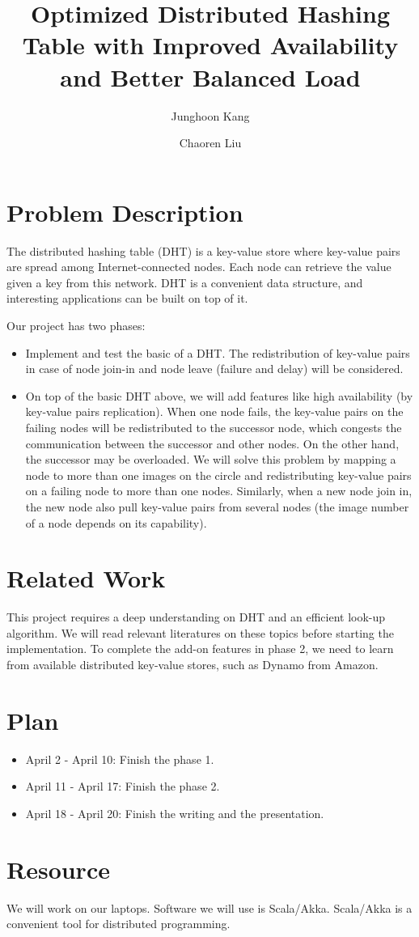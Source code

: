 \documentclass{article}
\author{Junghoon Kang \and Chaoren Liu }
\title{Optimized Distributed Hashing Table with Improved Availability and Better Balanced Load}
\begin{document}
\maketitle

\section{Problem Description}
The distributed hashing table (DHT) is a key-value store where key-value pairs are spread among Internet-connected nodes. 
Each node can retrieve the value given a key from this network. DHT is a convenient data structure, 
and interesting applications can be built on top of it. 

Our project has two phases:
\begin{itemize}
\item Implement and test the basic of a DHT. The redistribution of key-value pairs in case of node join-in and node leave (failure and delay) will be considered. 
\item On top of the basic DHT above, we will add features like high availability (by key-value pairs replication). When one node fails, the key-value pairs on the failing nodes will be redistributed to the successor node, which congests the communication between the successor and other nodes. On the other hand, 
the successor may be overloaded. We will solve this problem by mapping a node to more than one images on the circle and redistributing key-value pairs on a failing node to more than one nodes. Similarly, when a new node join in, the new node also pull key-value pairs from several nodes (the image number of a node depends on its capability).
\end{itemize}

\section{Related Work}
This project requires a deep understanding on DHT and an efficient look-up algorithm. We will read relevant literatures on these topics before starting 
the implementation. 
To complete the add-on features in phase 2, we need to learn from available distributed key-value stores, such as Dynamo from Amazon. 

\section{Plan}
\begin{itemize}
\item April 2 - April 10: Finish the phase 1. 
\item April 11 - April 17: Finish the phase 2. 
\item April 18 - April 20: Finish the writing and the presentation. 
\end{itemize}

\section{Resource}
We will work on our laptops. Software we will use is Scala/Akka. Scala/Akka is a convenient tool for distributed programming.
\end{document}
